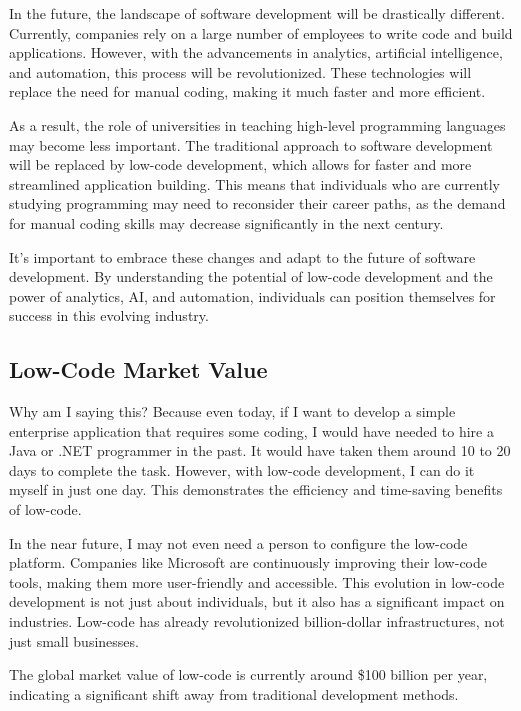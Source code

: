 In the future, the landscape of software development will be drastically
different. Currently, companies rely on a large number of employees to
write code and build applications. However, with the advancements in
analytics, artificial intelligence, and automation, this process will be
revolutionized. These technologies will replace the need for manual
coding, making it much faster and more efficient.

As a result, the role of universities in teaching high-level programming
languages may become less important. The traditional approach to
software development will be replaced by low-code development, which
allows for faster and more streamlined application building. This means
that individuals who are currently studying programming may need to
reconsider their career paths, as the demand for manual coding skills
may decrease significantly in the next century.

It's important to embrace these changes and adapt to the future of
software development. By understanding the potential of low-code
development and the power of analytics, AI, and automation, individuals
can position themselves for success in this evolving industry.

\subsection{Low-Code Market Value}\label{low-code-market-value}

Why am I saying this? Because even today, if I want to develop a simple
enterprise application that requires some coding, I would
have needed to hire a Java or .NET programmer in the past. It would have
taken them around 10 to 20 days to complete the task. However, with
low-code development, I can do it myself in just one day. This
demonstrates the efficiency and time-saving benefits of low-code.

In the near future, I may not even need a person to configure the
low-code platform. Companies like Microsoft are continuously improving
their low-code tools, making them more user-friendly and accessible.
This evolution in low-code development is not just about individuals,
but it also has a significant impact on industries. Low-code has already
revolutionized billion-dollar infrastructures, not just small
businesses.

The global market value of low-code is currently around \$100 billion
per year, indicating a significant shift away from traditional
development methods.

